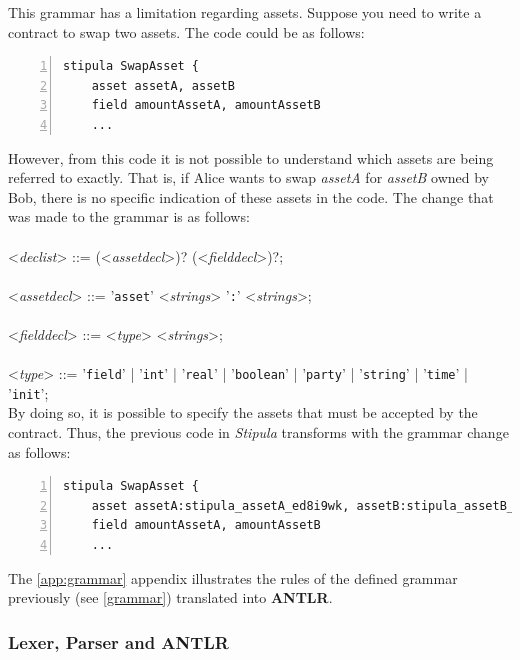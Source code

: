 This grammar has a limitation regarding assets. Suppose you need to write a contract to swap two assets. 
The code could be as follows:

\begin{Verbatim}[numbers=left,xleftmargin=1cm,firstnumber=1,breaklines=true,tabsize=2]
  stipula SwapAsset {
    asset assetA, assetB
    field amountAssetA, amountAssetB
    ...
\end{Verbatim}

However, from this code it is not possible to understand which assets are being referred to exactly. That 
is, if Alice wants to swap \textit{assetA} for \textit{assetB} owned by Bob, there is no specific 
indication of these assets in the code. The change that was made to the grammar is as follows:
\\\\
\noindent
<\textit{declist}> ::= (<\textit{assetdecl}>)? (<\textit{fielddecl}>)?;
\\\\
\noindent
<\textit{assetdecl}> ::= '\verb|asset|' <\textit{strings}> '\verb|:|' <\textit{strings}>;
\\\\
\noindent
<\textit{fielddecl}> ::= <\textit{type}> <\textit{strings}>;
\\\\
\noindent
<\textit{type}> ::= '\verb|field|' | '\verb|int|' | '\verb|real|' | '\verb|boolean|' | '\verb|party|' | '\verb|string|' | '\verb|time|' | '\verb|init|';
\\

By doing so, it is possible to specify the assets that must be accepted by the contract. Thus, the 
previous code in \textit{Stipula} transforms with the grammar change as follows:

\begin{Verbatim}[numbers=left,xleftmargin=1cm,firstnumber=1,breaklines=true,tabsize=2]
  stipula SwapAsset {
    asset assetA:stipula_assetA_ed8i9wk, assetB:stipula_assetB_pl1n5cc
    field amountAssetA, amountAssetB
    ...
\end{Verbatim}

The \ref{app:grammar} appendix illustrates the rules of the defined grammar previously (see \ref{grammar}) 
translated into \textbf{ANTLR}. 

\subsubsection{Lexer, Parser and ANTLR}
\label{lexer-parser-antlr}

